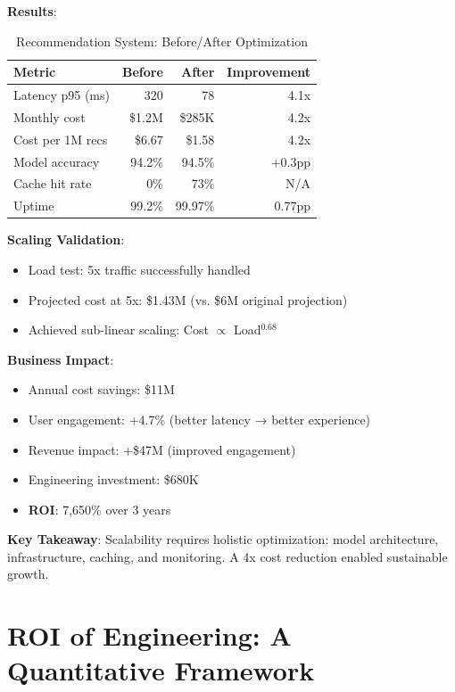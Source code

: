 \textbf{Results}:

\begin{table}[h]
\centering
\caption{Recommendation System: Before/After Optimization}
\begin{tabular}{lrrr}
\toprule
\textbf{Metric} & \textbf{Before} & \textbf{After} & \textbf{Improvement} \\
\midrule
Latency p95 (ms) & 320 & 78 & 4.1x \\
Monthly cost & \$1.2M & \$285K & 4.2x \\
Cost per 1M recs & \$6.67 & \$1.58 & 4.2x \\
Model accuracy & 94.2\% & 94.5\% & +0.3pp \\
Cache hit rate & 0\% & 73\% & N/A \\
Uptime & 99.2\% & 99.97\% & 0.77pp \\
\bottomrule
\end{tabular}
\end{table}

\textbf{Scaling Validation}:
\begin{itemize}
    \item Load test: 5x traffic successfully handled
    \item Projected cost at 5x: \$1.43M (vs. \$6M original projection)
    \item Achieved sub-linear scaling: Cost $\propto$ Load$^{0.68}$
\end{itemize}

\textbf{Business Impact}:
\begin{itemize}
    \item Annual cost savings: \$11M
    \item User engagement: +4.7\% (better latency → better experience)
    \item Revenue impact: +\$47M (improved engagement)
    \item Engineering investment: \$680K
    \item \textbf{ROI}: 7,650\% over 3 years
\end{itemize}

\textbf{Key Takeaway}: Scalability requires holistic optimization: model architecture, infrastructure, caching, and monitoring. A 4x cost reduction enabled sustainable growth.

\section{ROI of Engineering: A Quantitative Framework}

